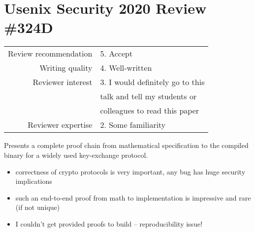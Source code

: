 \newpage
\section{Usenix Security 2020 Review \#324D}

\begin{tabular}{rl}
    \toprule
    Review recommendation & 5. Accept                        \\
    Writing quality       & 4. Well-written                  \\
    Reviewer interest     & 3. I would definitely go to this \\
                          & talk and tell my students or     \\
                          & colleagues to read this paper    \\
    Reviewer expertise    & 2. Some familiarity              \\
    \bottomrule
\end{tabular}

\begin{center}
\end{center}
Presents a complete proof chain from mathematical specification to the compiled binary for a widely used key-exchange protocol.

\begin{center}
\end{center}

\begin{itemize}
    \item correctness of crypto protocols is very important, any bug has huge security implications
    \item such an end-to-end proof from math to implementation is impressive and rare (if not unique)
\end{itemize}


\begin{center}
\end{center}

\begin{itemize}
    \item I couldn't get provided proofs to build – reproducibility issue!
\end{itemize}

\begin{center}
\end{center}


